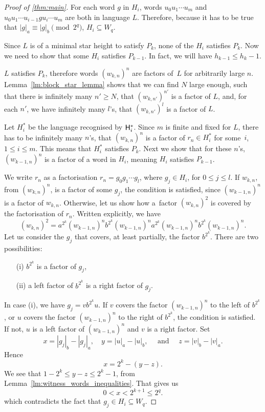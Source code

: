 \begin{proof}[Proof of \autoref*{thm:main}]
    For each word $g$ in $H_i$, words $u_0 u_1 \dotsm u_m$ and $u_0 u_1 \dotsm u_{i-1} g u_i \dotsm u_m$ are both in language $L$. Therefore, because it has to be true that $|g|_a \equiv |g|_b \pmod{2^q}$, $H_i \subseteq W_q$.

    Since $L$ is of a minimal star height to satisfy $P_k$, none of the $H_i$ satisfies $P_k$. Now we need to show that some $H_i$ satisfies $P_{k-1}$. In fact, we will have $h_{k-1} \leq h_k - 1$.

    $L$ satisfies $P_k$, therefore words ${(w_{k,n})}^n$ are factors of~$L$ for arbitrarily large $n$. Lemma~\ref*{lm:block_star_lemma} shows that we can find $N$ large enough, such that there is infinitely many $n' \geq N$, that ${(w_{k,n'})}^{n'}$ is a factor of $L$, and, for each $n'$, we have infinitely many $l$'s, that ${(w_{k,n'})}^l$ is a factor of $L$.

    Let $H_i^*$ be the language recognised by ${\mathsf{H}}_i^*$. Since $m$ is finite and fixed for $L$, there has to be infinitely many $n$'s, that ${(w_{k,n})}^n$ is a factor of $r_n \in H_i^*$ for some~$i$, $1 \leq i \leq m$. This means that $H_i^*$ satisfies $P_k$. Next we show that for these $n$'s, ${(w_{k-1,n})}^n$ is a factor of a word in $H_i$, meaning $H_i$ satisfies $P_{k-1}$.

    We write $r_n$ as a factorisation $r_n = g_0 g_1 \dotsm g_l$, where $g_j \in H_i$, for $0 \leq j \leq l$. If $w_{k,n}$, from ${(w_{k,n})}^n$, is a factor of some $g_j$, the condition is satisfied, since ${(w_{k-1,n})}^n$ is a factor of $w_{k,n}$. Otherwise, let us show how a~factor ${(w_{k,n})}^2$ is covered by the factorisation of $r_n$. Written explicitly, we have
    \[
        {(w_{k,n})}^2 = a^{2^k}{(w_{k-1,n})}^{n}b^{2^k}{(w_{k-1,n})}^{n}a^{2^k}{(w_{k-1,n})}^{n}b^{2^k}{(w_{k-1,n})}^{n}.
    \]
    Let us consider the $g_j$ that covers, at least partially, the factor $b^{2^k}$. There are two possibilities:
    \begin{itemize}
        \item[(i)] $b^{2^k}$ is a factor of $g_j$,
        \item[(ii)] a left factor of $b^{2^k}$ is a right factor of $g_j$.
    \end{itemize}

    In case (i), we have $g_j = v b^{2^k} u$. If $v$ covers the factor ${(w_{k-1,n})}^{n}$ to the left of $b^{2^k}$, or $u$ covers the factor ${(w_{k-1,n})}^{n}$ to the right of $b^{2^k}$, the condition is satisfied. If not, $u$ is a left factor of ${(w_{k-1,n})}^{n}$ and $v$ is a right factor. Set
    \[
        x = |g_j|_b - |g_j|_a, \quad y = |u|_a - |u|_b, \quad \text{ and } \quad z = |v|_b - |v|_a.
    \]
    Hence
    \[
        x = 2^k - (y - z).
    \]
    We see that $1 - 2^k \leq y - z \leq 2^k - 1$, from Lemma~\ref*{lm:witness_words_inequalities}. That gives us
    \[
        0 < x < 2^{k+1} \leq 2^q.
    \]
    which contradicts the fact that $g_j \in H_i \subseteq W_q$.


\end{proof}
